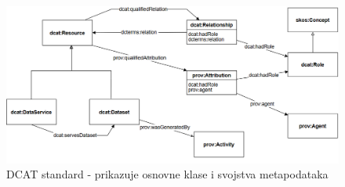 \begin{figure}[h!]
    \centering
    \includegraphics[width=1\textwidth]{figures/dcat.png}
    \caption{DCAT standard - prikazuje osnovne klase i svojstva metapodataka}
    \label{fig:dcat_standard}
\end{figure}